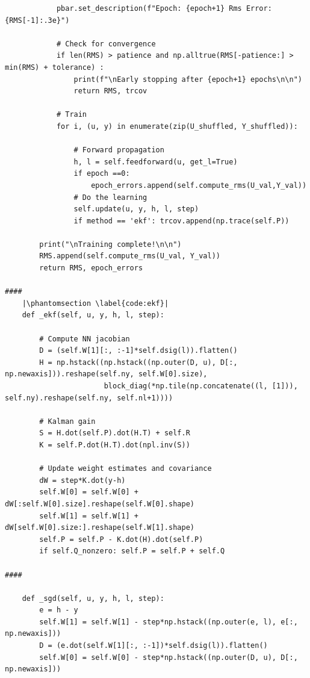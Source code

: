 \documentclass{article}
\begin{document}
\begin{verbatim}
            pbar.set_description(f"Epoch: {epoch+1} Rms Error: {RMS[-1]:.3e}")
            
            # Check for convergence
            if len(RMS) > patience and np.alltrue(RMS[-patience:] > min(RMS) + tolerance) :
                print(f"\nEarly stopping after {epoch+1} epochs\n\n")
                return RMS, trcov

            # Train
            for i, (u, y) in enumerate(zip(U_shuffled, Y_shuffled)):
                
                # Forward propagation
                h, l = self.feedforward(u, get_l=True)
                if epoch ==0:
                    epoch_errors.append(self.compute_rms(U_val,Y_val))
                # Do the learning
                self.update(u, y, h, l, step)
                if method == 'ekf': trcov.append(np.trace(self.P))
                
        print("\nTraining complete!\n\n")
        RMS.append(self.compute_rms(U_val, Y_val))
        return RMS, epoch_errors

####
    |\phantomsection \label{code:ekf}|
    def _ekf(self, u, y, h, l, step):

        # Compute NN jacobian
        D = (self.W[1][:, :-1]*self.dsig(l)).flatten()
        H = np.hstack((np.hstack((np.outer(D, u), D[:, np.newaxis])).reshape(self.ny, self.W[0].size),
                       block_diag(*np.tile(np.concatenate((l, [1])), self.ny).reshape(self.ny, self.nl+1))))

        # Kalman gain
        S = H.dot(self.P).dot(H.T) + self.R
        K = self.P.dot(H.T).dot(npl.inv(S))

        # Update weight estimates and covariance
        dW = step*K.dot(y-h)
        self.W[0] = self.W[0] + dW[:self.W[0].size].reshape(self.W[0].shape)
        self.W[1] = self.W[1] + dW[self.W[0].size:].reshape(self.W[1].shape)
        self.P = self.P - K.dot(H).dot(self.P)
        if self.Q_nonzero: self.P = self.P + self.Q

####

    def _sgd(self, u, y, h, l, step):
        e = h - y
        self.W[1] = self.W[1] - step*np.hstack((np.outer(e, l), e[:, np.newaxis]))
        D = (e.dot(self.W[1][:, :-1])*self.dsig(l)).flatten()
        self.W[0] = self.W[0] - step*np.hstack((np.outer(D, u), D[:, np.newaxis]))
\end{verbatim}

\clearpage
\end{document}
